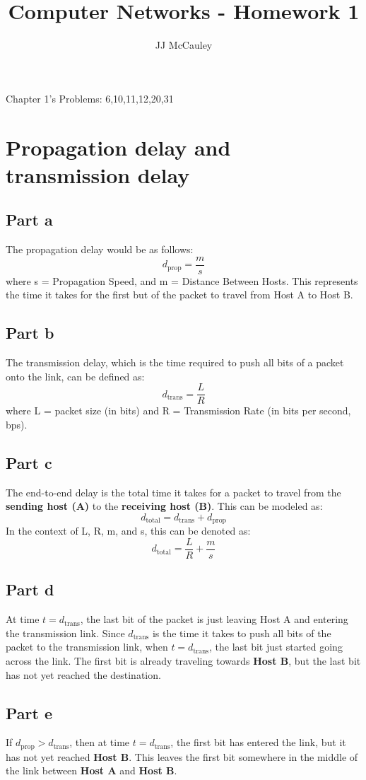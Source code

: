 \documentclass{article}
\title{Computer Networks - Homework 1}
\author{JJ McCauley}
\begin{document}
\maketitle

Chapter 1's Problems: 6,10,11,12,20,31

\setcounter{section}{5}
\section{Propagation delay and transmission delay}
\subsection{Part a}
The propagation delay would be as follows:
\[
d_{\text{prop}} = \frac{m}{s}
\]
where s = Propagation Speed, and m = Distance  Between Hosts. This represents the time it takes for the first but of the packet to travel from Host A to Host B.
\subsection{Part b}
The transmission delay, which is the time required to push all bits of a packet onto the link, can be defined as:
\[
d_{\text{trans}} = \frac{L}{R}
\]
where L = packet size (in bits) and R = Transmission Rate (in bits per second, bps).
\subsection{Part c}
The end-to-end delay is the total time it takes for a packet to travel from the \textbf{sending host (A)} to the \textbf{receiving host (B)}. This can be modeled as:
\[
d_{\text{total}} = d_{\text{trans}} + d_{\text{prop}}
\]
In the context of L, R, m, and s, this can be denoted as:
\[
d_{\text{total}} = \frac{L}{R} + \frac{m}{s}
\]
\subsection{Part d}
At time $t = d_{\text{trans}}$, the last bit of the packet is just leaving Host A and entering the transmission link. Since $d_{\text{trans}}$ is the time it takes to push all bits of the packet to the transmission link, when $t = d_{\text{trans}}$, the last bit just started going across the link. The first bit is already traveling towards \textbf{Host B}, but the last bit has not yet reached the destination.
\subsection{Part e}
If $d_{\text{prop}} > d_{\text{trans}}$, then at time $t = d_{\text{trans}}$, the first bit has entered the link, but it has not yet reached \textbf{Host B}. This leaves the first bit somewhere in the middle of the link between \textbf{Host A} and \textbf{Host B}.
\end{document}
